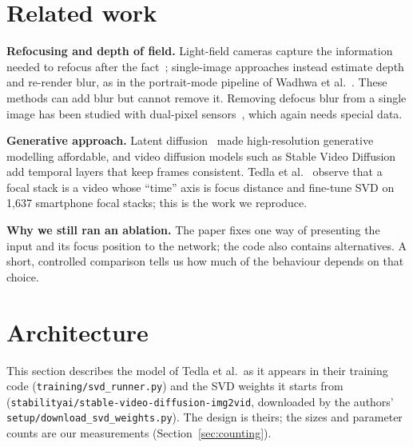 \documentclass[11pt]{article}
\begin{document}
\section{Related work}
\textbf{Refocusing and depth of field.} Light-field cameras capture the information needed to refocus after the fact~\cite{ng2005lightfield}; single-image approaches instead estimate depth and re-render blur, as in the portrait-mode pipeline of Wadhwa et al.~\cite{wadhwa2018synthetic}.
These methods can add blur but cannot remove it. Removing defocus blur from a single image has been studied with dual-pixel sensors~\cite{abuolaim2020defocus}, which again needs special data.

\textbf{Generative approach.} Latent diffusion~\cite{rombach2022ldm} made high-resolution generative modelling affordable, and video diffusion models such as Stable Video Diffusion~\cite{blattmann2023svd} add temporal layers that keep frames consistent.
Tedla et al.~\cite{tedla2025refocus} observe that a focal stack is a video whose ``time'' axis is focus distance and fine-tune SVD on 1{,}637 smartphone focal stacks; this is the work we reproduce.

\textbf{Why we still ran an ablation.} The paper fixes one way of presenting the input and its focus position to the network; the code also contains alternatives. A short, controlled comparison tells us how much of the behaviour depends on that choice.

\section{Architecture}\label{sec:arch}
This section describes the model of Tedla et al.\ as it appears in their training code (\texttt{training/svd\_runner.py}) and the SVD weights it starts from (\texttt{stabilityai/\allowbreak stable-\allowbreak video-\allowbreak diffusion-\allowbreak img2vid}, downloaded by the authors' \texttt{setup/\allowbreak download\_svd\_weights.py}).
The design is theirs; the sizes and parameter counts are our measurements (Section~\ref{sec:counting}).
\end{document}
